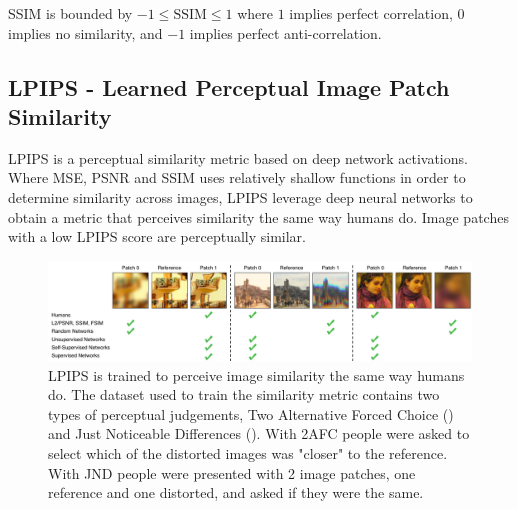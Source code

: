 SSIM is bounded by $-1 \leq \text{SSIM} \leq 1$ where $1$ implies perfect correlation, $0$ implies no similarity, and $-1$ implies perfect anti-correlation.

\subsection{LPIPS - Learned Perceptual Image Patch Similarity \cite{zhang_unreasonable_2018}}
LPIPS is a perceptual similarity metric based on deep network activations. Where MSE, PSNR and SSIM uses relatively shallow functions in order to determine similarity across images, LPIPS leverage deep neural networks to obtain a metric that perceives similarity the same way humans do. Image patches with a low LPIPS score are perceptually similar.

\begin{figure} [h]
    \label{fig:lpips}
    \centering
    \includegraphics[width=1.0\textwidth]{figures/LPIPS.png}
    \caption{LPIPS is trained to perceive image similarity the same way humans do. The dataset used to train the similarity metric contains two types of perceptual judgements, Two Alternative Forced Choice () and Just Noticeable Differences (). With 2AFC people were asked to select which of the distorted images was "closer" to the reference. With JND people were presented with 2 image patches, one reference and one distorted, and asked if they were the same.}
    \label{fig:my_label}
\end{figure}


